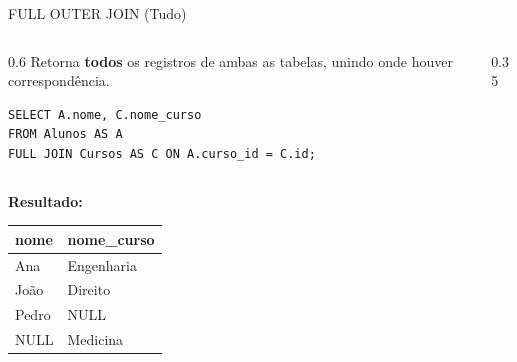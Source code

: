 \documentclass[10pt]{beamer}
\begin{document}
\begin{frame}[fragile]{FULL OUTER JOIN (Tudo)}
    \begin{columns}
        \begin{column}{0.6\textwidth}
            Retorna \textbf{todos} os registros de ambas as tabelas, unindo onde houver correspondência.
            \begin{lstlisting}
SELECT A.nome, C.nome_curso
FROM Alunos AS A
FULL JOIN Cursos AS C ON A.curso_id = C.id;
            \end{lstlisting}
        \end{column}
        \begin{column}{0.35\textwidth}
            \centering
        \end{column}
    \end{columns}
    \textbf{Resultado:}
    \small
    \begin{table}
        \begin{tabular}{ll}
        \toprule
        \textbf{nome} & \textbf{nome\_curso} \\ \midrule
        Ana & Engenharia \\
        João & Direito \\
        \alert{Pedro} & \alert{NULL} \\
        \alert{NULL} & \alert{Medicina} \\ \bottomrule
        \end{tabular}
    \end{table}
\end{frame}
\end{document}
